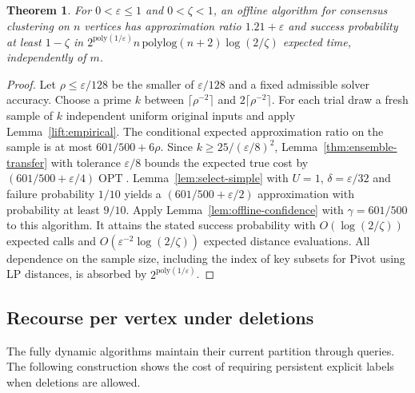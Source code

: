 \documentclass[11pt]{article}
\newtheorem{theorem}{Theorem}[section]
\begin{document}
\begin{theorem}\label{lift:offline}
For $0<\varepsilon\le1$ and $0<\zeta<1$, an offline algorithm for
consensus clustering on $n$ vertices has approximation ratio
$1.21+\varepsilon$ and success probability at least
$1-\zeta$ in $2^{\mathrm{poly}(1/\varepsilon)}
n\,\mathrm{polylog}(n+2)\log(2/\zeta)$ expected time,
independently of $m$.
\end{theorem}
\begin{proof}
Let $\rho\le\varepsilon/128$ be the smaller of $\varepsilon/128$ and a
fixed admissible solver accuracy. Choose a prime $k$ between
$\lceil\rho^{-2}\rceil$ and $2\lceil\rho^{-2}\rceil$.
For each trial draw a fresh sample of $k$ independent uniform original
inputs and apply Lemma~\ref{lift:empirical}. The conditional expected
approximation ratio on the sample is at most $601/500+6\rho$. Since
$k\ge25/(\varepsilon/8)^2$, Lemma~\ref{thm:ensemble-transfer}
with tolerance $\varepsilon/8$ bounds the expected true cost by
$(601/500+\varepsilon/4)\operatorname{OPT}$.
Lemma~\ref{lem:select-simple} with $U=1$, $\delta=\varepsilon/32$
and failure probability $1/10$ yields a $(601/500+\varepsilon/2)$
approximation with probability at least $9/10$.
Apply Lemma~\ref{lem:offline-confidence} with $\gamma=601/500$
to this algorithm. It attains the stated
success probability with $O(\log(2/\zeta))$ expected calls and
$O(\varepsilon^{-2}\log(2/\zeta))$ expected distance evaluations.
All dependence on the sample size, including the index of key subsets for
Pivot using LP distances, is absorbed by $2^{\mathrm{poly}(1/\varepsilon)}$.
\end{proof}

\subsection{Recourse per vertex under deletions}
\label{app:recourse}

The fully dynamic algorithms maintain their current partition
through queries. The following construction shows the cost of
requiring persistent explicit labels when deletions are allowed.
\end{document}
